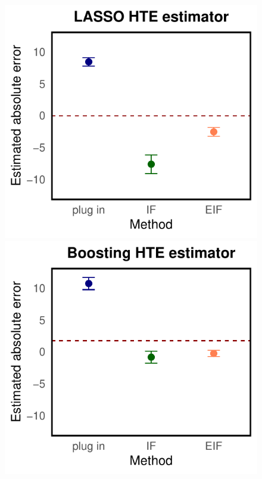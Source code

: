 \documentclass[twoside]{article}
\newcommand{\1}{{\mathbbm{1}}}
\begin{document}
\begin{figure}[ht]
        \centering
        \begin{minipage}{0.15\textwidth}
                \centering
                \includegraphics[clip, trim = 0cm 0cm 0cm 0cm, width = \textwidth]{plot/inaccurate_nuisance_function_estimator_absolute_LASSO.pdf}
        \end{minipage}
        \begin{minipage}{0.15\textwidth}
                \centering
                \includegraphics[clip, trim = 0cm 0cm 0cm 0cm, width = \textwidth]{plot/inaccurate_nuisance_function_estimator_absolute_xgboost.pdf}

\end{minipage}
\end{figure}
\end{document}
